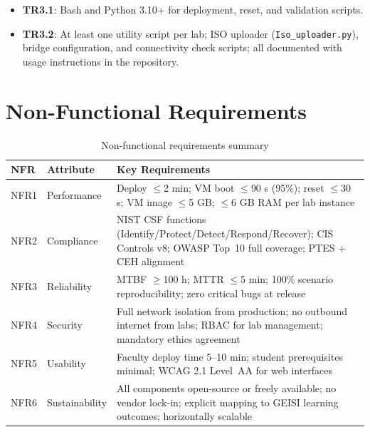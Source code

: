 \begin{itemize}
\item \textbf{TR3.1}: Bash and Python 3.10+ for deployment, reset, and validation scripts.

\item \textbf{TR3.2}: At least one utility script per lab; ISO uploader
      (\texttt{Iso\_uploader.py}), bridge configuration, and connectivity check scripts;
      all documented with usage instructions in the repository.
\end{itemize}

\section{Non-Functional Requirements}

\begin{table}[H]
  \centering
  \small
  \setlength{\tabcolsep}{4pt}
  \renewcommand{\arraystretch}{1.15}
  \begin{tabularx}{\textwidth}{l l X}
    \toprule
    \textbf{NFR} & \textbf{Attribute} & \textbf{Key Requirements} \\
    \midrule
    NFR1 & Performance    & Deploy $\leq$2 min; VM boot $\leq$90 s (95\%); reset $\leq$30 s;
                            VM image $\leq$5 GB; $\leq$6 GB RAM per lab instance \\
    NFR2 & Compliance     & NIST CSF functions (Identify/Protect/Detect/Respond/Recover);
                            CIS Controls v8; OWASP Top~10 full coverage; PTES + CEH alignment \\
    NFR3 & Reliability    & MTBF $\geq$100 h; MTTR $\leq$5 min; 100\% scenario reproducibility;
                            zero critical bugs at release \\
    NFR4 & Security       & Full network isolation from production; no outbound internet from labs;
                            RBAC for lab management; mandatory ethics agreement \\
    NFR5 & Usability      & Faculty deploy time 5--10 min; student prerequisites minimal;
                            WCAG 2.1 Level~AA for web interfaces \\
    NFR6 & Sustainability & All components open-source or freely available; no vendor lock-in;
                            explicit mapping to GEISI learning outcomes; horizontally scalable \\
    \bottomrule
  \end{tabularx}
  \caption{Non-functional requirements summary}
  \label{tab:nfr_summary}
\end{table}

